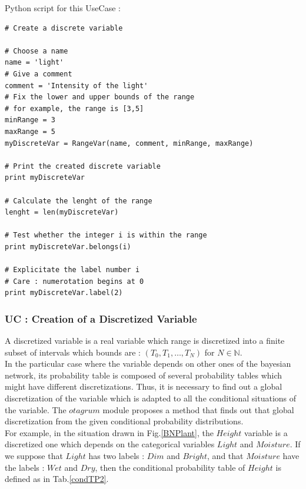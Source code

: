\espace
Python  script for this UseCase :

\begin{lstlisting}
# Create a discrete variable

# Choose a name
name = 'light'
# Give a comment
comment = 'Intensity of the light'
# Fix the lower and upper bounds of the range
# for example, the range is [3,5]
minRange = 3
maxRange = 5
myDiscreteVar = RangeVar(name, comment, minRange, maxRange)

# Print the created discrete variable
print myDiscreteVar

# Calculate the lenght of the range
lenght = len(myDiscreteVar)

# Test whether the integer i is within the range
print myDiscreteVar.belongs(i)

# Explicitate the label number i
# Care : numerotation begins at 0
print myDiscreteVar.label(2)
\end{lstlisting}


\newpage \subsubsection{UC : Creation of a Discretized Variable}

A discretized variable is a real variable which range is discretized into a finite subset of intervals which bounds are : $(T_0,T_1, \hdots, T_N)$ for $N \in \mathbb{N}$. \\

In the particular case where the variable depends on other ones of the bayesian network, its probability table is composed of several probability tables which might have different discretizations. Thus, it is necessary to find out a global discretization of the variable which is adapted to all the conditional situations of the variable. The $otagrum$ module proposes a method that finds out that global discretization from the given conditional probability distributions.\\

For example, in the  situation drawn in Fig.\ref{BNPlant}, the  $Height$ variable is a discretized one which  depends on the categorical variables $Light$ and $Moisture$. If we suppose that $Light$ has two labels : $Dim$ and $Bright$, and that $Moisture$ have the labels : $Wet$ and $Dry$, then the conditional probability table  of $Height$ is defined as in Tab.\ref{condTP2}.\\

